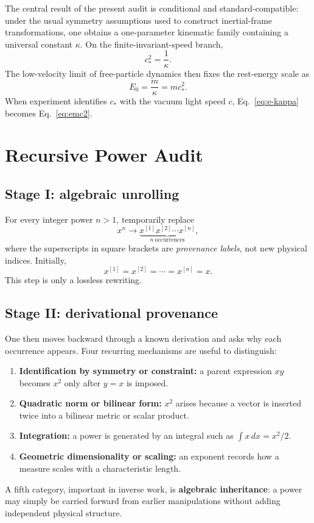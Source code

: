 \documentclass[11pt,a4paper]{article}
\newcommand{\kpar}{\kappa}
\newcommand{\cstar}{c_{\!*}}
\begin{document}
The central result of the present audit is conditional and standard-compatible: under the usual symmetry assumptions used to construct inertial-frame transformations, one obtains a one-parameter kinematic family containing a universal constant $\kpar$. On the finite-invariant-speed branch,
\begin{equation}
\cstar^2=\frac{1}{\kpar}.
\label{eq:c-kappa}
\end{equation}
The low-velocity limit of free-particle dynamics then fixes the rest-energy scale as
\begin{equation}
E_0=\frac{m}{\kpar}=m\cstar^2.
\label{eq:e-kappa}
\end{equation}
When experiment identifies $\cstar$ with the vacuum light speed $c$, Eq.~\eqref{eq:e-kappa} becomes Eq.~\eqref{eq:emc2}.

\section{Recursive Power Audit}
\subsection{Stage I: algebraic unrolling}
For every integer power $n>1$, temporarily replace
\begin{equation}
x^n \longrightarrow \underbrace{x^{[1]}x^{[2]}\cdots x^{[n]}}_{n\ \text{occurrences}},
\label{eq:unroll}
\end{equation}
where the superscripts in square brackets are \emph{provenance labels}, not new physical indices. Initially,
\begin{equation}
x^{[1]}=x^{[2]}=\cdots=x^{[n]}=x.
\end{equation}
This step is only a lossless rewriting.

\subsection{Stage II: derivational provenance}
One then moves backward through a known derivation and asks why each occurrence appears. Four recurring mechanisms are useful to distinguish:
\begin{enumerate}
\item \textbf{Identification by symmetry or constraint:} a parent expression $xy$ becomes $x^2$ only after $y=x$ is imposed.
\item \textbf{Quadratic norm or bilinear form:} $x^2$ arises because a vector is inserted twice into a bilinear metric or scalar product.
\item \textbf{Integration:} a power is generated by an integral such as $\int x\,dx=x^2/2$.
\item \textbf{Geometric dimensionality or scaling:} an exponent records how a measure scales with a characteristic length.
\end{enumerate}
A fifth category, important in inverse work, is \textbf{algebraic inheritance}: a power may simply be carried forward from earlier manipulations without adding independent physical structure.
\end{document}
